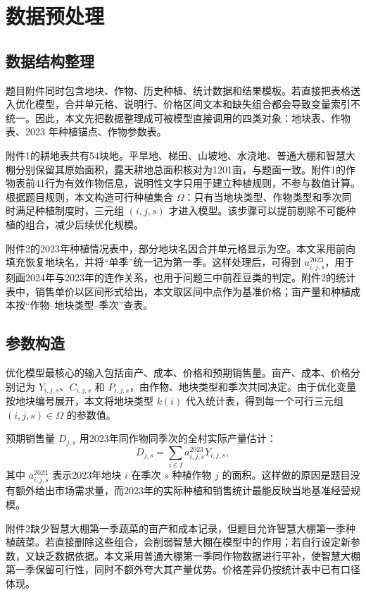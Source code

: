 \section{数据预处理}

\subsection{数据结构整理}

题目附件同时包含地块、作物、历史种植、统计数据和结果模板。若直接把表格送入优化模型，合并单元格、说明行、价格区间文本和缺失组合都会导致变量索引不统一。因此，本文先把数据整理成可被模型直接调用的四类对象：地块表、作物表、2023 年种植锚点、作物参数表。

附件1的耕地表共有54块地。平旱地、梯田、山坡地、水浇地、普通大棚和智慧大棚分别保留其原始面积，露天耕地总面积核对为1201亩，与题面一致。附件1的作物表前41行为有效作物信息，说明性文字只用于建立种植规则，不参与数值计算。根据题目规则，本文构造可行种植集合 $\Omega$：只有当地块类型、作物类型和季次同时满足种植制度时，三元组 $(i,j,s)$ 才进入模型。该步骤可以提前剔除不可能种植的组合，减少后续优化规模。

附件2的2023年种植情况表中，部分地块名因合并单元格显示为空。本文采用前向填充恢复地块名，并将“单季”统一记为第一季。这样处理后，可得到 $u^{2023}_{i,j,s}$，用于刻画2024年与2023年的连作关系，也用于问题三中前茬豆类的判定。附件2的统计表中，销售单价以区间形式给出，本文取区间中点作为基准价格；亩产量和种植成本按“作物--地块类型--季次”查表。

\subsection{参数构造}

优化模型最核心的输入包括亩产、成本、价格和预期销售量。亩产、成本、价格分别记为 $Y_{i,j,s}$、$C_{i,j,s}$ 和 $P_{i,j,s}$，由作物、地块类型和季次共同决定。由于优化变量按地块编号展开，本文将地块类型 $k(i)$ 代入统计表，得到每一个可行三元组 $(i,j,s)\in\Omega$ 的参数值。

预期销售量 $D_{j,s}$ 用2023年同作物同季次的全村实际产量估计：
\begin{equation}
  D_{j,s}=\sum_{i\in I} a^{2023}_{i,j,s}Y_{i,j,s},
\end{equation}
其中 $a^{2023}_{i,j,s}$ 表示2023年地块 $i$ 在季次 $s$ 种植作物 $j$ 的面积。这样做的原因是题目没有额外给出市场需求量，而2023年的实际种植和销售统计最能反映当地基准经营规模。

附件2缺少智慧大棚第一季蔬菜的亩产和成本记录，但题目允许智慧大棚第一季种植蔬菜。若直接删除这些组合，会削弱智慧大棚在模型中的作用；若自行设定新参数，又缺乏数据依据。本文采用普通大棚第一季同作物数据进行平补，使智慧大棚第一季保留可行性，同时不额外夸大其产量优势。价格差异仍按统计表中已有口径体现。

